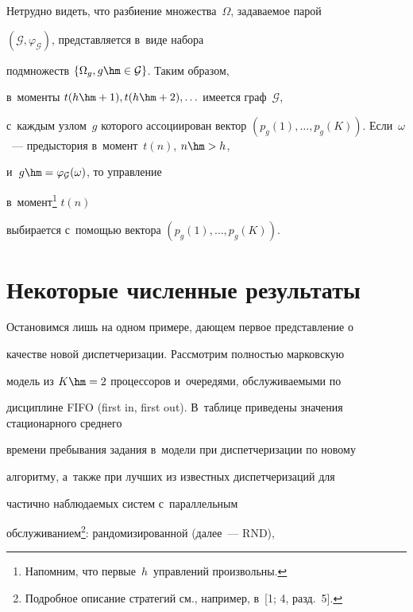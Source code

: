   


  Нетрудно видеть, что разбиение множества~$\Omega$, задаваемое парой 


$(\mathcal{G},\varphi_{\mathcal{G}})$, представляется в~виде набора 


подмножеств $\{\Omega_g, g\hm\in \mathcal{G}\}$. Таким образом, 


в~моменты $t(h\hm+1), t(h\hm+2),\ldots$ имеется граф~$\mathcal{G}$, 


с~каждым узлом~$g$ которого ассоциирован вектор $(p_g(1), \ldots , 


p_g(K))$. Если~$\omega$~--- предыстория в~момент~$t(n)$, $n\hm> h$, 


и~$g\hm= \varphi_{\mathcal{G}}(\omega)$, то управление 


в~момент\footnote{Напомним, что первые~$h$~управлений произвольны.} $t(n)$ 


выбирается с~помощью вектора $(p_g(1),\ldots , p_g(K))$.


  


\section{Некоторые численные результаты}


  


  Остановимся лишь на одном примере, дающем первое представление о 


качестве новой диспетчеризации. Рассмотрим полностью марковскую 


модель из $K\hm=2$ процессоров и~очередями, обслуживаемыми по 


дисциплине FIFO (first in, first out). В~таблице приведены значения стационарного среднего 


времени пребывания задания в~модели при диспетчеризации по новому 


алгоритму, а~также при лучших из известных диспетчеризаций для 


частично наблюдаемых сис\-тем с~параллельным 


обслуживанием\footnote{Подробное описание стратегий см., например, в~[1; 4, разд.~5].}: рандомизированной (далее~--- RND), \linebreak






